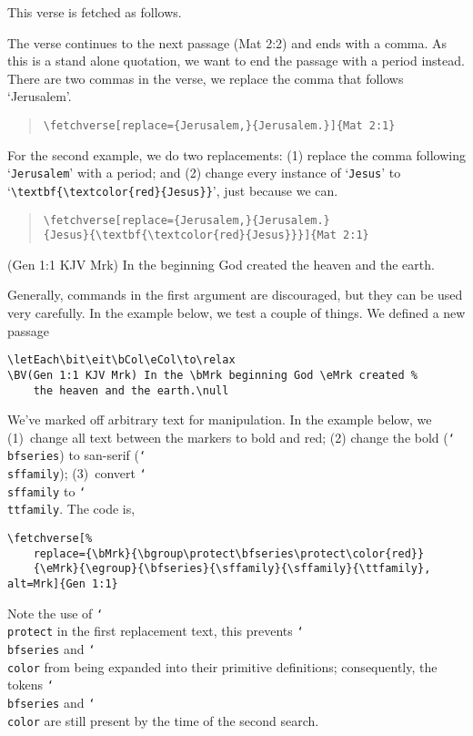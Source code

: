 \documentclass{article}
\providecommand\cs[1]{\texttt{\char`\\#1}}
\begin{document}
This verse is fetched as follows.
\begin{quote}
\end{quote}
The verse continues to the next passage (Mat 2:2) and ends with a comma. As
this is a stand alone quotation, we want to end the passage with a period
instead. There are two commas in the verse, we replace the comma that follows
`Jerusalem'.
\begin{quote}
\verb|\fetchverse[replace={Jerusalem,}{Jerusalem.}]{Mat 2:1}|\\[3pt]
\end{quote}
For the second example, we do two replacements: (1) replace the comma
following `\texttt{Jerusalem}' with a period; and (2) change every instance
of `\texttt{Jesus}' to `\verb|\textbf{\textcolor{red}{Jesus}}|', just because
we can.
\begin{quote}
\verb|\fetchverse[replace={Jerusalem,}{Jerusalem.}|\\
\null\hskip20pt\verb|{Jesus}{\textbf{\textcolor{red}{Jesus}}}]{Mat 2:1}|\\[3pt]
\end{quote}
\let\bMrk\relax\let\eMrk\relax
\begin{declareBVs}
\BV(Gen 1:1 KJV Mrk)  In the \bMrk beginning God \eMrk %
created the heaven and the earth.\null
\end{declareBVs}
Generally, commands in the first argument are discouraged, but they can be
used very carefully. In the example below, we test a couple of things. We
defined a new passage
\begin{verbatim}
\letEach\bit\eit\bCol\eCol\to\relax
\BV(Gen 1:1 KJV Mrk) In the \bMrk beginning God \eMrk created %
    the heaven and the earth.\null
\end{verbatim}
We've marked off arbitrary text for manipulation. In the example below, we
(1)~change all text between the markers to bold and red; (2) change the bold
(\cs{bfseries}) to san-serif (\cs{sffamily}); (3)~convert \cs{sffamily} to
\cs{ttfamily}. The code is,
\begin{verbatim}
\fetchverse[%
    replace={\bMrk}{\bgroup\protect\bfseries\protect\color{red}}
    {\eMrk}{\egroup}{\bfseries}{\sffamily}{\sffamily}{\ttfamily},
alt=Mrk]{Gen 1:1}
\end{verbatim}
Note the use of \cs{protect} in the first replacement text, this prevents \cs{bfseries}
and \cs{color} from being expanded into their primitive definitions; consequently, the
tokens \cs{bfseries} and \cs{color} are still present by the time of the second search.
\end{document}
